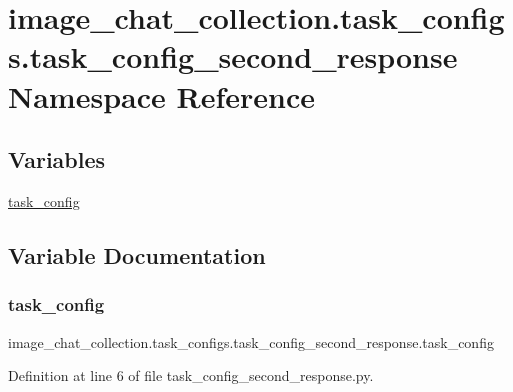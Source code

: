 \hypertarget{namespaceimage__chat__collection_1_1task__configs_1_1task__config__second__response}{}\section{image\+\_\+chat\+\_\+collection.\+task\+\_\+configs.\+task\+\_\+config\+\_\+second\+\_\+response Namespace Reference}
\label{namespaceimage__chat__collection_1_1task__configs_1_1task__config__second__response}
\subsection*{Variables}
\begin{DoxyCompactItemize}
\item 
\hyperlink{namespaceimage__chat__collection_1_1task__configs_1_1task__config__second__response_a9fa63c051f2737183d0aaae448b401c0}{task\+\_\+config}
\end{DoxyCompactItemize}


\subsection{Variable Documentation}
\mbox{\label{namespaceimage__chat__collection_1_1task__configs_1_1task__config__second__response_a9fa63c051f2737183d0aaae448b401c0}} 
\subsubsection{\texorpdfstring{task\+\_\+config}{task\_config}}
{\footnotesize\ttfamily image\+\_\+chat\+\_\+collection.\+task\+\_\+configs.\+task\+\_\+config\+\_\+second\+\_\+response.\+task\+\_\+config}



Definition at line 6 of file task\+\_\+config\+\_\+second\+\_\+response.\+py.

